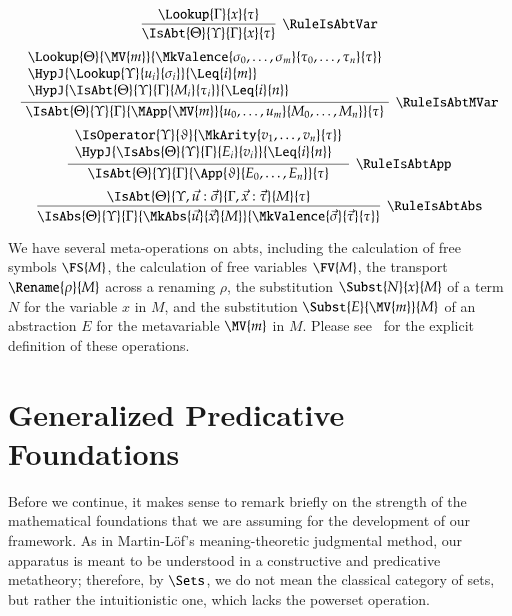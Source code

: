 \documentclass[11pt]{article}
\theoremstyle{definition}
\theoremstyle{notation}
\theoremstyle{remark}
\numberwithin{equation}{section}
\begin{document}
\[
  \infer[\RuleIsAbtVar]{
    \IsAbt{\Theta}{\Upsilon}{\Gamma}{x}{\tau}
  }{
    \Lookup{\Gamma}{x}{\tau}
  }
\]
\[
  \infer[\RuleIsAbtMVar]{
    \IsAbt{\Theta}{\Upsilon}{\Gamma}{
      \MApp{\MV{m}}{u_0,\dots,u_m}{M_0,\dots,M_n}
    }{\tau}
  }{
    \begin{array}{l}
      \Lookup{\Theta}{\MV{m}}{
        \MkValence{
          \sigma_0,\dots,\sigma_m
        }{
          \tau_0,\dots,\tau_n
        }{\tau}
      }
\\
      \HypJ{
        \Lookup{\Upsilon}{u_i}{\sigma_i}
      }{\Leq{i}{m}}
\\
      \HypJ{
        \IsAbt{\Theta}{\Upsilon}{\Gamma}{M_i}{\tau_i}
      }{\Leq{i}{n}}
    \end{array}
  }
\]
\[
  \infer[\RuleIsAbtApp]{
    \IsAbt{\Theta}{\Upsilon}{\Gamma}{
      \App{\vartheta}{E_0,\dots,E_n}
    }{\tau}
  }{
    \begin{array}{l}
      \IsOperator{\Upsilon}{\vartheta}{
        \MkArity{v_1,\dots,v_n}{\tau}
      }
\\
      \HypJ{
        \IsAbs{\Theta}{\Upsilon}{\Gamma}{E_i}{v_i}
      }{\Leq{i}{n}}
    \end{array}
  }
\]
\[
  \infer[\RuleIsAbtAbs]{
    \IsAbs{\Theta}{\Upsilon}{\Gamma}{
      \MkAbs{\vec{u}}{\vec{x}}{M}
    }{
      \MkValence{\vec{\sigma}}{\vec{\tau}}{\tau}
    }
  }{
    \IsAbt{
      \Theta
    }{
      \Upsilon, \vec{u}:\vec{\sigma}
    }{
      \Gamma,\vec{x}:{\vec{\tau}}
    }{
      M
    }{\tau}
  }
\]

We have several meta-operations on abts, including the calculation of free
symbols $\FS{M}$, the calculation of free variables $\FV{M}$, the transport
$\Rename{\rho}{M}$ across a renaming $\rho$, the substitution $\Subst{N}{x}{M}$
of a term $N$ for the variable $x$ in $M$, and the substitution
$\Subst{E}{\MV{m}}{M}$ of an abstraction $E$ for the metavariable $\MV{m}$ in
$M$. Please see~\cite{sterling-morrison:2015} for the explicit definition of
these operations.

\section{Generalized Predicative Foundations}

Before we continue, it makes sense to remark briefly on the strength of the
mathematical foundations that we are assuming for the development of our
framework. As in Martin-L\"of's meaning-theoretic judgmental method, our
apparatus is meant to be understood in a constructive and predicative
metatheory; therefore, by $\Sets$, we do not mean the classical category of
sets, but rather the intuitionistic one, which lacks the powerset
operation.
\end{document}

